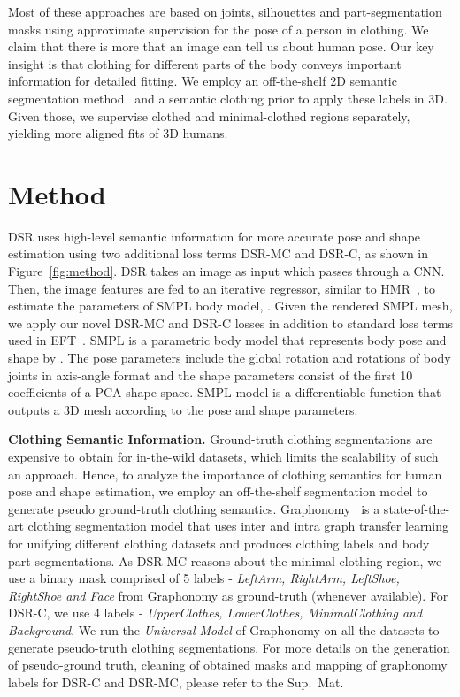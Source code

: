 \documentclass[10pt,twocolumn,letterpaper]{article}
\newcommand{\modelname}[0]{DSR\xspace}
\begin{document}
Most of these approaches are based on joints, silhouettes and part-segmentation masks using approximate supervision for the pose of a person in clothing. 
We claim that there is more that an image can tell us about  human pose. Our key insight is that clothing for different parts of the body conveys important information for detailed fitting. We employ an off-the-shelf 2D semantic segmentation method~\cite{graphonomy} and a semantic clothing prior to apply these labels in 3D. Given those, we supervise clothed and minimal-clothed regions separately, yielding more aligned fits of 3D humans. \section{Method}

{\modelname} uses high-level semantic information for more accurate pose and shape estimation using two additional loss terms {\modelname}-MC and {\modelname}-C, as shown in Figure~\ref{fig:method}. {\modelname} takes an image  as input which passes through a CNN. Then, the image features  are fed to an iterative regressor, similar to HMR~\cite{hmr}, to estimate the parameters of SMPL body model, . Given the rendered SMPL mesh, we apply our novel \modelname-MC and \modelname-C losses in addition to standard loss terms used in EFT~\cite{eft}. 
SMPL is a parametric body model that represents body pose and shape by . The pose parameters  include the global rotation and rotations of  body joints in axis-angle format and the shape parameters  consist of the first 10 coefficients of a PCA shape space. SMPL model is a differentiable function  that outputs a 3D mesh according to the pose and shape parameters.

\textbf{Clothing Semantic Information.} Ground-truth clothing segmentations are  expensive to obtain for in-the-wild datasets, which limits the scalability of such an approach. Hence, to analyze the importance of clothing semantics for human pose and shape estimation, we employ an off-the-shelf segmentation model to generate pseudo ground-truth clothing semantics.
Graphonomy~\cite{graphonomy} is a state-of-the-art clothing segmentation model that uses inter and intra graph transfer learning for unifying different clothing datasets and produces  clothing labels and body part segmentations. As \modelname-MC reasons about the minimal-clothing region, we use a binary mask comprised of 5 labels - \emph{LeftArm, RightArm, LeftShoe, RightShoe and Face} from Graphonomy as ground-truth (whenever available). For \modelname-C, we use 4 labels - \emph{UpperClothes, LowerClothes, MinimalClothing and Background}. 
We run the \emph{Universal Model} of Graphonomy on all the datasets to generate pseudo-truth clothing segmentations. For more details on the generation of pseudo-ground truth, cleaning of obtained masks and mapping of graphonomy labels for \modelname-C and \modelname-MC, please refer to the Sup.~Mat.
\end{document}
